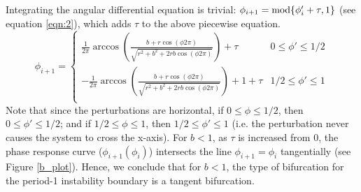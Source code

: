 Integrating the angular differential equation is trivial: $\phi_{i+1} = \textnormal{mod} \{\phi'_i + \tau,1\}$ (see equation \ref{eqn:2}), which adds $\tau$ to the above piecewise equation. 
\begin{equation}
    \phi_{i+1} =
    \begin{cases}
     \frac{1}{2\pi}\arccos(\frac{b+r \cos(\phi 2\pi)}{\sqrt{r^2+b^2+2rb\cos(\phi 2\pi)}}) + \tau & 0 \leq \phi' \leq 1/2 \\
    -\frac{1}{2\pi}\arccos(\frac{b+r \cos(\phi 2\pi)}{\sqrt{r^2+b^2+2rb\cos(\phi 2\pi)}}) + 1 +\tau & 1/2 \leq \phi' \leq 1 \\
    \end{cases}
    \label{eq: b_plot}
\end{equation}
Note that since the perturbations are horizontal, if $0 \leq \phi \leq 1/2$, then $0 \leq \phi' \leq 1/2$; and if $1/2 \leq \phi \leq 1$, then $1/2 \leq \phi' \leq 1$ (i.e. the perturbation never causes the system to cross the x-axis). For $b<1$, as $\tau$ is increased from 0, the phase response curve ($\phi_{i+1}(\phi_i)$) intersects the line $\phi_{i+1}= \phi_i$ tangentially (see Figure \ref{b_plot}). Hence, we conclude that for $b<1$, the type of bifurcation for the period-1 instability boundary is a tangent bifurcation. 

